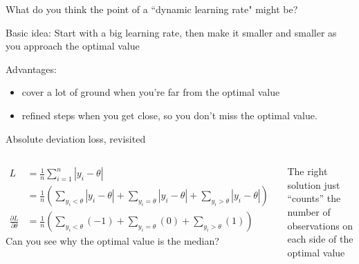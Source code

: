 \documentclass[aspectratio=169]{beamer}
\begin{document}
\begin{frame}{What do you think the point of a ``dynamic learning rate" might be?}

\pause

Basic idea: Start with a big learning rate, then make it smaller and smaller as you approach the optimal value

\pause

\vspace{10mm}

Advantages: 
\begin{itemize}
\item cover a lot of ground when you're far from the optimal value
\item refined steps when you get close, so you don't miss the optimal value.
\end{itemize}

\end{frame}

\begin{frame}{Absolute deviation loss, revisited}

\begin{columns}
\begin{align*}
L &= \frac{1}{n} \sum_{i = 1}^{n}|y_i - \theta|\\
&= \frac{1}{n} \left( \sum_{y_i < \theta}|y_i - \theta| + \sum_{y_i = \theta}|y_i - \theta| + \sum_{y_i > \theta}|y_i - \theta| \right)\\
\frac{\partial L}{\partial \theta} &= \frac{1}{n} \left( \sum_{y_i < \theta}(-1) + \sum_{y_i = \theta}(0) + \sum_{y_i > \theta}(1) \right)
\end{align*}
Can you see why the optimal value is the median?

\vspace{5mm}

\pause

The right solution just ``counts'' the number of observations on each side of the optimal value

\end{columns}

\end{frame}
\end{document}
